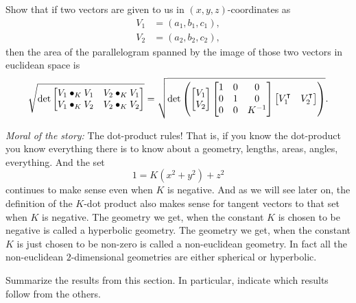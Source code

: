 \documentclass{ximera}
\begin{document}
\begin{problem}
  
Show that if two vectors are given to us in $(x,y,z)$-coordinates as%
\begin{align*}
V_{1}  &  =\left(  a_{1},b_{1},c_{1}\right), \\
V_{2}  &  =\left(  a_{2},b_{2},c_{2}\right),
\end{align*}
then the area of the parallelogram spanned by the image of those two vectors in euclidean
space is%
\[
\sqrt{\det
\begin{bmatrix}
V_{1}\bullet_{K}V_{1} & V_{2}\bullet_{K}V_{1}\\
V_{1}\bullet_{K}V_{2} & V_{2}\bullet_{K}V_{2}%
\end{bmatrix}}
=\sqrt{\det\left( 
\begin{bmatrix}
V_{1} \\
V_{2}
\end{bmatrix}
\begin{bmatrix}
1 & 0 & 0\\
0 & 1 & 0\\
0 & 0 & K^{-1}%
\end{bmatrix}
\begin{bmatrix}
V_{1}^\transpose & V_{2}^\transpose%
\end{bmatrix}
\right) }.
\]
\end{problem}

\textit{Moral of the story:} The dot-product rules! That is, if you
know the dot-product you know everything there is to know about a
geometry, lengths, areas, angles, everything. And the set
\[
1=K(x^2+y^2)+z^2
\]
continues to make sense even when $K$ is
negative. And as we will see later on, the definition of the $K$-dot
product also makes sense for tangent vectors to that set when $K$ is
negative. The geometry we get, when the constant $K$ is chosen to be
negative is called a hyperbolic geometry. The geometry we get, when
the constant $K$ is just chosen to be non-zero is called a
non-euclidean geometry.  In fact all the non-euclidean $2$-dimensional
geometries are either spherical or hyperbolic.



\begin{problem}
Summarize the results from this section. In particular, indicate which
results follow from the others.
\begin{freeResponse}
\end{freeResponse}
\end{problem}
\end{document}
